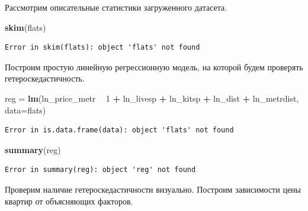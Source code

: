 \documentclass[]{book}
\newenvironment{Shaded}{\begin{snugshade}}{\end{snugshade}}
\newcommand{\DataTypeTok}[1]{\textcolor[rgb]{0.13,0.29,0.53}{#1}}
\newcommand{\DecValTok}[1]{\textcolor[rgb]{0.00,0.00,0.81}{#1}}
\newcommand{\KeywordTok}[1]{\textcolor[rgb]{0.13,0.29,0.53}{\textbf{#1}}}
\newcommand{\NormalTok}[1]{#1}
\newcommand{\OperatorTok}[1]{\textcolor[rgb]{0.81,0.36,0.00}{\textbf{#1}}}
\newcommand{\StringTok}[1]{\textcolor[rgb]{0.31,0.60,0.02}{#1}}
\begin{document}
Рассмотрим описательные статистики загруженного датасета.

\begin{Shaded}
\begin{Highlighting}[]
\KeywordTok{skim}\NormalTok{(flats)}
\end{Highlighting}
\end{Shaded}

\begin{verbatim}
Error in skim(flats): object 'flats' not found
\end{verbatim}

Построим простую линейную регрессионную модель, на которой будем проверять гетероскедастичность.

\begin{Shaded}
\begin{Highlighting}[]
\NormalTok{reg =}\StringTok{ }\KeywordTok{lm}\NormalTok{(ln_price_metr }\OperatorTok{~}\StringTok{ }\DecValTok{1} \OperatorTok{+}\StringTok{ }\NormalTok{ln_livesp }\OperatorTok{+}\StringTok{ }\NormalTok{ln_kitsp }\OperatorTok{+}\StringTok{ }\NormalTok{ln_dist }\OperatorTok{+}\StringTok{ }\NormalTok{ln_metrdist, }\DataTypeTok{data=}\NormalTok{flats)}
\end{Highlighting}
\end{Shaded}

\begin{verbatim}
Error in is.data.frame(data): object 'flats' not found
\end{verbatim}

\begin{Shaded}
\begin{Highlighting}[]
\KeywordTok{summary}\NormalTok{(reg)}
\end{Highlighting}
\end{Shaded}

\begin{verbatim}
Error in summary(reg): object 'reg' not found
\end{verbatim}

Проверим наличие гетероскедастичности визуально. Построим зависимости цены квартир от объясняющих факторов.

\begin{Shaded}
\end{Shaded}
\end{document}
